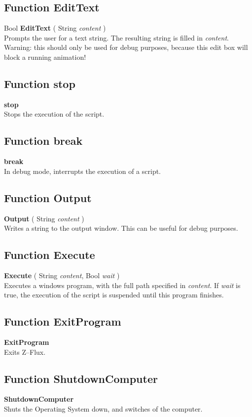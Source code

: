 \documentclass[10pt]{book}
\newcommand{\var}[1]{\textit{#1}}
\newcommand{\softwarename}{Z--Flux}
\begin{document}
\subsection{Function EditText \label{F:EditText}}
Bool \textbf{EditText} ( String \textit{content} ) \\
Prompts the user for a text string. The resulting string is filled in \var{content}. \\
Warning: this should only be used for debug purposes, because this edit box will block a running animation!


\subsection{Function stop \label{F:stop}}
\textbf{stop} \\
Stops the execution of the script.

\subsection{Function break \label{F:break}}
\textbf{break} \\
In debug mode, interrupts the execution of a script.

\subsection{Function Output \label{F:Output}}
\textbf{Output} ( String \textit{content} ) \\
Writes a string to the output window. This can be useful for debug purposes.

\subsection{Function Execute \label{F:Execute}}
\textbf{Execute} ( String \textit{content}, Bool \textit{wait} ) \\
Executes a windows program, with the full path specified in \var{content}. If \var{wait} is true, the execution of the script is suspended until this program finishes.

\subsection{Function ExitProgram \label{F:ExitProgram}}
\textbf{ExitProgram} \\
Exits \softwarename.

\subsection{Function ShutdownComputer \label{F:ShutdownComputer}}
\textbf{ShutdownComputer} \\
Shuts the Operating System down, and switches of the computer.
\end{document}
